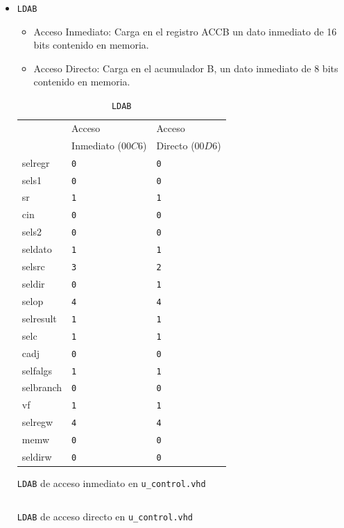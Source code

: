 \documentclass{IEEEtran}
\newenvironment{code}{\captionsetup{type=listing}}{}
\begin{document}
\begin{itemize}
\item \texttt{LDAB}
\begin{itemize}
\item Acceso Inmediato: Carga en el registro ACCB un dato inmediato de 16 bits contenido en memoria.
\item Acceso Directo: Carga en el acumulador B, un dato inmediato de 8 bits contenido en memoria.
\end{itemize}
\begin{table}[htbp]
\caption{\texttt{LDAB}}
\centering
\begin{tabular}{lll}
\hline
 & Acceso & Acceso\\
 & Inmediato (\(00C6\)) & Directo (\(00D6\))\\
\hline
selregr & \texttt{0} & \texttt{0}\\
sels1 & \texttt{0} & \texttt{0}\\
sr & \texttt{1} & \texttt{1}\\
cin & \texttt{0} & \texttt{0}\\
sels2 & \texttt{0} & \texttt{0}\\
seldato & \texttt{1} & \texttt{1}\\
selsrc & \texttt{3} & \texttt{2}\\
seldir & \texttt{0} & \texttt{1}\\
selop & \texttt{4} & \texttt{4}\\
selresult & \texttt{1} & \texttt{1}\\
selc & \texttt{1} & \texttt{1}\\
cadj & \texttt{0} & \texttt{0}\\
selfalgs & \texttt{1} & \texttt{1}\\
selbranch & \texttt{0} & \texttt{0}\\
vf & \texttt{1} & \texttt{1}\\
selregw & \texttt{4} & \texttt{4}\\
memw & \texttt{0} & \texttt{0}\\
seldirw & \texttt{0} & \texttt{0}\\
\hline
\end{tabular}
\end{table}
\begin{code}
\caption{\texttt{LDAB} de acceso inmediato en \texttt{u\_control.vhd}}
\inputminted[firstline=73, lastline=91]{vhdl}{../Risc/u_control.vhd}
\end{code}
\begin{code}
\caption{\texttt{LDAB} de acceso directo en \texttt{u\_control.vhd}}

\end{code}
\end{itemize}
\end{document}
